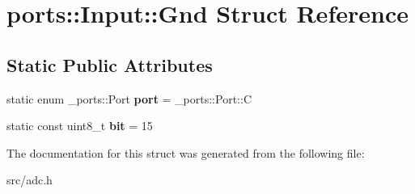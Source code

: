 \hypertarget{structports_1_1Input_1_1Gnd}{}\section{ports\+:\+:Input\+:\+:Gnd Struct Reference}
\label{structports_1_1Input_1_1Gnd}
\subsection*{Static Public Attributes}
\begin{DoxyCompactItemize}
\item 
static enum \+\_\+ports\+::\+Port {\bfseries port} = \+\_\+ports\+::\+Port\+::C\hypertarget{structports_1_1Input_1_1Gnd_aba196f4d58a57f784abd483ec0ffc7c3}{}\label{structports_1_1Input_1_1Gnd_aba196f4d58a57f784abd483ec0ffc7c3}

\item 
static const uint8\+\_\+t {\bfseries bit} = 15\hypertarget{structports_1_1Input_1_1Gnd_aaac9ee16b06d198ccc7d003a5e7c3fa6}{}\label{structports_1_1Input_1_1Gnd_aaac9ee16b06d198ccc7d003a5e7c3fa6}

\end{DoxyCompactItemize}


The documentation for this struct was generated from the following file\+:\begin{DoxyCompactItemize}
\item 
src/adc.\+h\end{DoxyCompactItemize}
